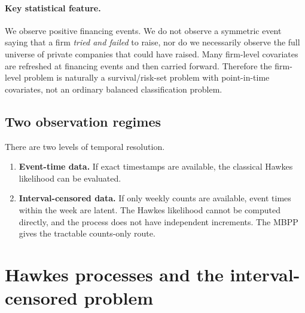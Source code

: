 \documentclass[11pt]{article}
\theoremstyle{plain}
\theoremstyle{definition}
\theoremstyle{remark}
\begin{document}
\paragraph{Key statistical feature.}
We observe positive financing events. We do not observe a symmetric event saying that a firm \emph{tried and failed} to raise, nor do we necessarily observe the full universe of private companies that could have raised. Many firm-level covariates are refreshed at financing events and then carried forward. Therefore the firm-level problem is naturally a survival/risk-set problem with point-in-time covariates, not an ordinary balanced classification problem.

\subsection{Two observation regimes}
There are two levels of temporal resolution.
\begin{enumerate}[leftmargin=1.5em]
\item \textbf{Event-time data.} If exact timestamps are available, the classical Hawkes likelihood can be evaluated.
\item \textbf{Interval-censored data.} If only weekly counts are available, event times within the week are latent. The Hawkes likelihood cannot be computed directly, and the process does not have independent increments. The MBPP gives the tractable counts-only route.
\end{enumerate}

\section{Hawkes processes and the interval-censored problem}
\label{sec:hawkes}
\end{document}
